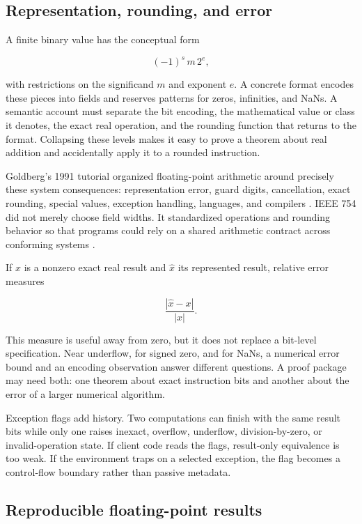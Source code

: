 \subsection{Representation, rounding, and error}

A finite binary value has the conceptual form

\[
  (-1)^s\,m\,2^e,
\]

with restrictions on the significand \(m\) and exponent \(e\). A concrete
format encodes these pieces into fields and reserves patterns for zeros,
infinities, and NaNs. A semantic account must separate the bit encoding, the
mathematical value or class it denotes, the exact real operation, and the
rounding function that returns to the format. Collapsing these levels makes it
easy to prove a theorem about real addition and accidentally apply it to a
rounded instruction.

Goldberg's 1991 tutorial organized floating-point arithmetic around precisely
these system consequences: representation error, guard digits, cancellation,
exact rounding, special values, exception handling, languages, and compilers
\autocite{goldberg1991floating}. IEEE 754 did not merely choose field widths.
It standardized operations and rounding behavior so that programs could rely
on a shared arithmetic contract across conforming systems
\autocite{ieee7542019}.

If \(x\) is a nonzero exact real result and \(\widehat{x}\) its represented
result, relative error measures

\[
  \frac{|\widehat{x}-x|}{|x|}.
\]

This measure is useful away from zero, but it does not replace a bit-level
specification. Near underflow, for signed zero, and for NaNs, a numerical error
bound and an encoding observation answer different questions. A proof package
may need both: one theorem about exact instruction bits and another about the
error of a larger numerical algorithm.

Exception flags add history. Two computations can finish with the same result
bits while only one raises inexact, overflow, underflow, division-by-zero, or
invalid-operation state. If client code reads the flags, result-only
equivalence is too weak. If the environment traps on a selected exception,
the flag becomes a control-flow boundary rather than passive metadata.

\subsection{Reproducible floating-point results}


